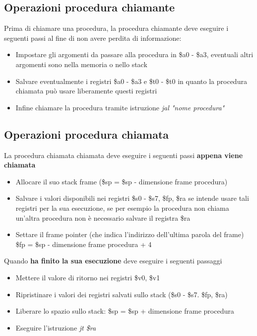 \documentclass[12pt, a4paper, openany]{book}
\begin{document}
\subsection{Operazioni procedura chiamante}
Prima di chiamare una procedura, la procedura chiamante deve eseguire i seguenti passi
 al fine di non avere perdita di informazione:
\begin{itemize}
    \item Impostare gli argomenti da passare alla procedura in \$a0 - \$a3, eventuali
    altri argomenti sono nella memoria o nello stack
    \item Salvare eventualmente i registri \$a0 - \$a3 e \$t0 - \$t0 in quanto la procedura
    chiamata può usare liberamente questi registri
    \item Infine chiamare la procedura tramite istruzione \textit{jal "nome procedura"}
\end{itemize}

\subsection{Operazioni procedura chiamata}
La procedura chiamata chiamata deve eseguire i seguenti passi \textbf{appena viene chiamata}
\begin{itemize}
    \item Allocare il suo stack frame (\$sp = \$sp - dimensione frame procedura)
    \item Salvare i valori disponibili nei registri \$s0 - \$s7, \$fp, \$ra se intende
    usare tali registri per la sua esecuzione, se per esempio la procedura non chiama
    un'altra procedura non è necessario salvare il registra \$ra
    \item Settare il frame pointer (che indica l'indirizzo dell'ultima parola del frame)
    \$fp = \$sp - dimensione frame procedura + 4
\end{itemize}

Quando \textbf{ha finito la sua esecuzione} deve eseguire i seguenti passaggi
\begin{itemize}
    \item Mettere il valore di ritorno nei registri \$v0, \$v1
    \item Ripristinare i valori dei registri salvati sullo stack (\$s0 - \$s7. \$fp, \$ra)
    \item Liberare lo spazio sullo stack: \$sp = \$sp + dimensione frame procedura
    \item Eseguire l'istruzione \textit{jt \$ra}
\end{itemize}
\end{document}
